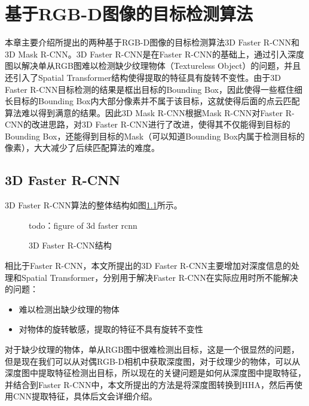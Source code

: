 \chapter{基于RGB-D图像的目标检测算法}
\label{chap:detector}
本章主要介绍所提出的两种基于RGB-D图像的目标检测算法3D Faster R-CNN和3D Mask R-CNN。3D Faster R-CNN是在Faster R-CNN\cite{Ren}的基础上，通过引入深度图以解决单从RGB图难以检测缺少纹理物体（Textureless Object）的问题，并且还引入了Spatial Transformer结构使得提取的特征具有旋转不变性。由于3D Faster R-CNN目标检测的结果是框出目标的Bounding Box，因此使得一些框住细长目标的Bounding Box内大部分像素并不属于该目标，这就使得后面的点云匹配算法难以得到满意的结果。因此3D Mask R-CNN根据Mask R-CNN\cite{He2017}对Faster R-CNN的改进思路，对3D Faster R-CNN进行了改进，使得其不仅能得到目标的Bounding Box，还能得到目标的Mask（可以知道Bounding Box内属于检测目标的像素），大大减少了后续匹配算法的难度。

\section{3D Faster R-CNN}
3D Faster R-CNN算法的整体结构如图\ref{fig:3d_faster_rcnn}所示。
\begin{figure}
  \centering
  todo：figure of 3d faster rcnn
  \caption{3D Faster R-CNN结构}
  \label{fig:3d_faster_rcnn}
\end{figure}

相比于Faster R-CNN，本文所提出的3D Faster R-CNN主要增加对深度信息的处理和Spatial Transformer，分别用于解决Faster R-CNN在实际应用时所不能解决的问题：
\begin{itemize}
\item 难以检测出缺少纹理的物体
\item 对物体的旋转敏感，提取的特征不具有旋转不变性
\end{itemize}

对于缺少纹理的物体，单从RGB图中很难检测出目标，这是一个很显然的问题，但是现在我们可以从对偶RGB-D相机中获取深度图，对于纹理少的物体，可以从深度图中提取特征检测出目标，所以现在的关键问题是如何从深度图中提取特征，并结合到Faster R-CNN中，本文所提出的方法是将深度图转换到HHA，然后再使用CNN提取特征，具体后文会详细介绍。

